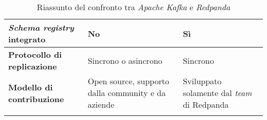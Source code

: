 \begin{longtable}{|>{\centering\arraybackslash}p{}|>{\centering\arraybackslash}p{}|>{\centering\arraybackslash}p{}|}
	\hline
	\textbf{\textit{Schema registry} integrato} & No                                                                                                                                                          & Sì                                                                                                                                                                     \\
	\hline
	\textbf{Protocollo di replicazione}         & Sincrono o asincrono                                                                                                                                        & Sincrono                                                                                                                                                               \\
	\hline
	\textbf{Modello di contribuzione}           & Open source, supporto dalla community e da aziende                                                                                                          & Sviluppato solamente dal \textit{team} di Redpanda                                                                                                                     \\
	\hline
	\caption{Riassunto del confronto tra \textit{Apache Kafka} e \textit{Redpanda}}
	\label{table:2}
\end{longtable}





















